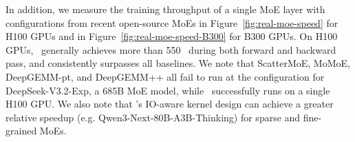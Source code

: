 



In addition, we measure the training throughput of a single MoE layer with configurations from recent open-source MoEs in Figure~\ref{fig:real-moe-speed} for H100 GPUs and in Figure~\ref{fig:real-moe-speed-B300} for B300 GPUs. On H100 GPUs, \Algname~generally achieves more than 550 \tflops~during both forward and backward pass, and consistently surpasses all baselines. We note that ScatterMoE, MoMoE, DeepGEMM-pt, and DeepGEMM++ all fail to run at the configuration for DeepSeek-V3.2-Exp, a 685B MoE model, while \Algname~successfully runs on a single H100 GPU. We also note that \Algname's IO-aware kernel design can achieve a greater relative speedup (e.g. Qwen3-Next-80B-A3B-Thinking) for sparse and fine-grained MoEs. 



